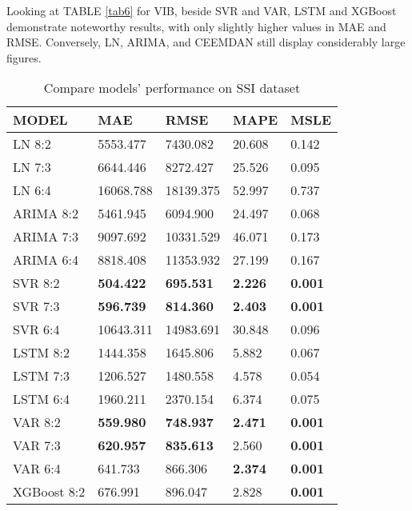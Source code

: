 \documentclass{ieeeojies}
\begin{document}
\noindent Looking at TABLE \ref{tab6} for VIB, beside SVR and VAR, LSTM and XGBoost demonstrate noteworthy results, with only slightly higher values in MAE and RMSE. Conversely, LN, ARIMA, and CEEMDAN still display considerably large figures.

\begin{table}[H]
\renewcommand{\arraystretch}{1.5}
\centering
\caption{Compare models' performance on SSI dataset}
\label{tab4}
\begin{tabular}{lp{1.1cm}p{1.2cm}p{1cm}p{0.9cm}}
\hline
\rowcolor{headercolor}
\textbf{MODEL}  & \textbf{MAE} & \textbf{RMSE} & \textbf{MAPE} & \textbf{MSLE}\\
\hline
\cellcolor{firstcolcolor} LN  8:2 & 5553.477 & 7430.082 & 20.608 & 0.142\\
\cellcolor{firstcolcolor} LN  7:3 & 6644.446 & 8272.427 & 25.526 & 0.095 \\
\cellcolor{firstcolcolor} LN  6:4 & 16068.788 & 18139.375 & 52.997 & 0.737\\
\cellcolor{firstcolcolor} ARIMA  8:2 & 5461.945 & 6094.900 & 24.497 & 0.068 \\
\cellcolor{firstcolcolor} ARIMA  7:3 & 9097.692 & 10331.529 & 46.071 & 0.173 \\
\cellcolor{firstcolcolor} ARIMA  6:4 & 8818.408 & 11353.932 & 27.199 & 0.167 \\
\cellcolor{firstcolcolor} SVR  8:2 & \textbf{504.422} & \textbf{695.531} & \textbf{2.226} & \textbf{0.001} \\
\cellcolor{firstcolcolor} SVR  7:3 & \textbf{596.739} & \textbf{814.360} & \textbf{2.403} & \textbf{0.001} \\
\cellcolor{firstcolcolor} SVR  6:4 & 10643.311 & 14983.691 & 30.848 & 0.096 \\
\cellcolor{firstcolcolor} LSTM  8:2 & 1444.358 & 1645.806 & 5.882 & 0.067 \\
\cellcolor{firstcolcolor} LSTM  7:3 & 1206.527 & 1480.558 & 4.578 & 0.054 \\
\cellcolor{firstcolcolor} LSTM  6:4 & 1960.211 & 2370.154 & 6.374 & 0.075 \\
\cellcolor{firstcolcolor} VAR  8:2 & \textbf{559.980} & \textbf{748.937} & \textbf{2.471} & \textbf{0.001} \\
\cellcolor{firstcolcolor} VAR  7:3 & \textbf{620.957} & \textbf{835.613} & 2.560 & \textbf{0.001} \\
\cellcolor{firstcolcolor} VAR  6:4 & 641.733 & 866.306 & \textbf{2.374} & \textbf{0.001} \\
\cellcolor{firstcolcolor} XGBoost  8:2 & 676.991 & 896.047 & 2.828 & \textbf{0.001} \\

\end{tabular}
\end{table}
\end{document}
